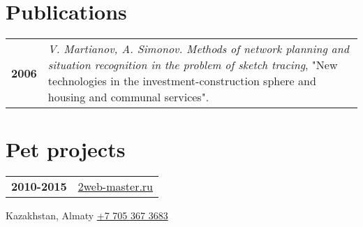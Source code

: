 \documentclass[pastel]{simplehipstercv}
\newlength{\rightcolwidth}
\begin{document}
\begin{paracol}{2}
\begin{minipage}[t]{0.3\textwidth}
\end{minipage}\hfill
\begin{minipage}[t]{0.3\textwidth}
\section*{Publications}
\begin{tabular}{>{\footnotesize\bfseries}r >{\footnotesize}p{}}
    2006 & \emph{V. Martianov, A. Simonov. Methods of network planning and situation recognition in the problem of sketch tracing}, "New technologies in the investment-construction sphere and housing and communal services".
\end{tabular}
\bigskip

\section*{Pet projects}
\begin{tabular}{>{\footnotesize\bfseries}r >{\footnotesize}p{}}
    2010-2015 & \protect\href{https://2web-master.ru/}{2web-master.ru}
\end{tabular}
\end{minipage}
\vspace{1em}





\vfill{} %

\setlength{\parindent}{0pt}
\begin{minipage}[t]{\rightcolwidth}
\begin{center}\fontfamily{\sfdefault}\selectfont \color{black!70}
{\small{} Kazakhstan, Almaty  \protect\href{tel:+77053673683}{+7 705 367 3683}  \protect\href{mailto:\emailadr}{\emailadr}
}
\end{center}
\end{minipage}

\end{paracol}
\end{document}
